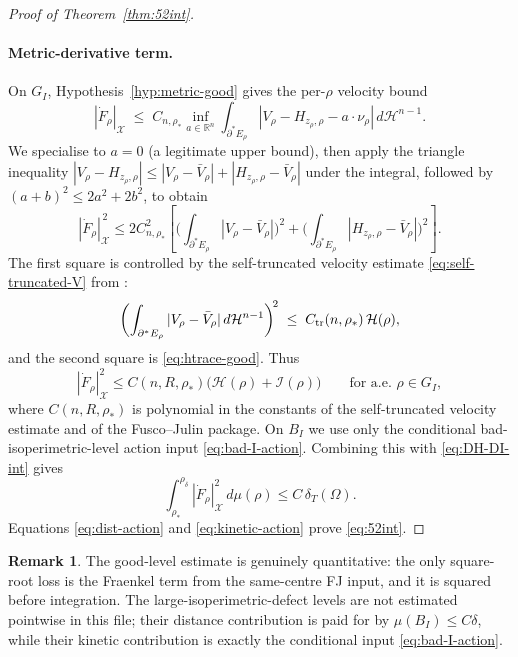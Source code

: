 \documentclass[11pt]{article}
\theoremstyle{definition}
\newtheorem{remark}[theorem]{Remark}
\newcommand{\R}{\mathbb{R}}
\newcommand{\Om}{\Omega}
\newcommand{\rstar}{\rho_{*}}
\newcommand{\X}{\mathcal X}
\begin{document}
\begin{proof}[Proof of Theorem~\ref{thm:52int}]
\paragraph{Metric-derivative term.}
On $G_I$, Hypothesis~\ref{hyp:metric-good} gives the per-$\rho$ velocity bound
\[
   |\dot F_\rho|_\X\;\le\;C_{n,\rstar}\inf_{a\in\R^n}\!
   \int_{\partial^*E_\rho}|V_\rho-H_{z_\rho,\rho}-a\cdot\nu_\rho|\,
     d\mathcal H^{n-1}.
\]
We specialise to $a=0$ (a legitimate upper bound), then apply the
triangle inequality
$|V_\rho-H_{z_\rho,\rho}|\le|V_\rho-\bar V_\rho|+|H_{z_\rho,\rho}-\bar V_\rho|$
under the integral, followed by $(a+b)^2\le 2a^2+2b^2$, to obtain
\begin{equation}\label{eq:Fdot-decomp}
   |\dot F_\rho|_\X^{\,2}\le 2C_{n,\rstar}^{2}
   \left[
      \biggl(\int_{\partial^*E_\rho}|V_\rho-\bar V_\rho|\biggr)^{\!2}
      +
      \biggl(\int_{\partial^*E_\rho}|H_{z_\rho,\rho}-\bar V_\rho|\biggr)^{\!2}
   \right].
\end{equation}
The first square is controlled by the self-truncated velocity estimate
\eqref{eq:self-truncated-V} from \cite{TrimmedVelocityRepair}:
\begin{equation}\label{eq:V-bar-V}
   \biggl(\int_{\partial^*E_\rho}|V_\rho-\bar V_\rho|\,
     d\mathcal H^{n-1}\biggr)^{\!2}
   \;\le\;C_{\rm tr}(n,\rstar)\,\mathcal H(\rho),
\end{equation}
and the second square is \eqref{eq:htrace-good}.  Thus
\[
   |\dot F_\rho|_\X^2\le C(n,R,\rstar)\bigl(\mathcal H(\rho)+\mathcal I(\rho)\bigr)
   \qquad\text{for a.e. }\rho\in G_I,
\]
where $C(n,R,\rstar)$ is polynomial in the constants of the
self-truncated velocity estimate and of the Fusco--Julin package.
On $B_I$ we use only the conditional bad-isoperimetric-level action
input \eqref{eq:bad-I-action}.  Combining this with
\eqref{eq:DH-DI-int} gives
\begin{equation}\label{eq:kinetic-action}
   \int_{\rstar}^{\rho_\delta}|\dot F_\rho|_\X^2\,d\mu(\rho)
   \le C\,\delta_T(\Om).
\end{equation}
Equations \eqref{eq:dist-action} and \eqref{eq:kinetic-action} prove
\eqref{eq:52int}.
\end{proof}

\begin{remark}
The good-level estimate is genuinely quantitative: the only square-root
loss is the Fraenkel term from the same-centre FJ input, and it is squared
before integration.  The large-isoperimetric-defect levels are not
estimated pointwise in this file; their distance contribution is paid for
by $\mu(B_I)\le C\delta$, while their kinetic contribution is exactly the
conditional input \eqref{eq:bad-I-action}.
\end{remark}
\end{document}
